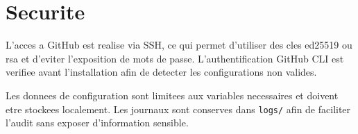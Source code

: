 \section{Securite}
L'acces a GitHub est realise via SSH, ce qui permet d'utiliser des cles ed25519 ou
rsa et d'eviter l'exposition de mots de passe. L'authentification GitHub CLI est
verifiee avant l'installation afin de detecter les configurations non valides.

Les donnees de configuration sont limitees aux variables necessaires et doivent
etre stockees localement. Les journaux sont conserves dans \texttt{logs/} afin de
faciliter l'audit sans exposer d'information sensible.
